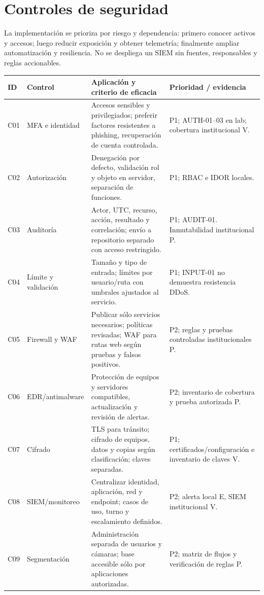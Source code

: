\documentclass[10pt,a4paper]{article}
\newcommand{\cabecera}[1]{\textbf{#1}}
\begin{document}
\section{Controles de seguridad}
La implementación se prioriza por riesgo y dependencia: primero conocer activos y accesos; luego reducir exposición y obtener telemetría; finalmente ampliar automatización y resiliencia. No se despliega un SIEM sin fuentes, responsables y reglas accionables.
\begin{TablaCompacta}
\begin{longtable}{P{18mm}P{31mm}P{68mm}P{42mm}}
\toprule\cabecera{ID} & \cabecera{Control} & \cabecera{Aplicación y criterio de eficacia} & \cabecera{Prioridad / evidencia}\\\midrule\endhead
C01 & MFA e identidad & Accesos sensibles y privilegiados; preferir factores resistentes a phishing, recuperación de cuenta controlada. & P1; AUTH-01--03 en lab; cobertura institucional V.\\
C02 & Autorización & Denegación por defecto, validación rol y objeto en servidor, separación de funciones. & P1; RBAC e IDOR locales.\\
C03 & Auditoría & Actor, UTC, recurso, acción, resultado y correlación; envío a repositorio separado con acceso restringido. & P1; AUDIT-01. Inmutabilidad institucional P.\\
C04 & Límite y validación & Tamaño y tipo de entrada; límites por usuario/ruta con umbrales ajustados al servicio. & P1; INPUT-01 no demuestra resistencia DDoS.\\
C05 & Firewall y WAF & Publicar sólo servicios necesarios; políticas revisadas; WAF para rutas web según pruebas y falsos positivos. & P2; reglas y pruebas controladas institucionales P.\\
C06 & EDR/antimalware & Protección de equipos y servidores compatibles, actualización y revisión de alertas. & P2; inventario de cobertura y prueba autorizada P.\\
C07 & Cifrado & TLS para tránsito; cifrado de equipos, datos y copias según clasificación; claves separadas. & P1; certificados/configuración e inventario de claves V.\\
C08 & SIEM/monitoreo & Centralizar identidad, aplicación, red y endpoint; casos de uso, turno y escalamiento definidos. & P2; alerta local E, SIEM institucional V.\\
C09 & Segmentación & Administración separada de usuarios y cámaras; base accesible sólo por aplicaciones autorizadas. & P2; matriz de flujos y verificación de reglas P.\\

\end{longtable}
\end{TablaCompacta}
\end{document}
